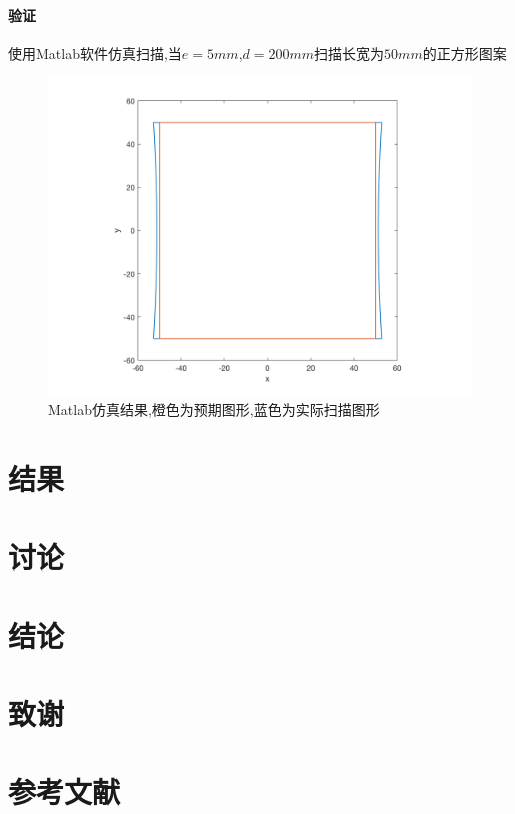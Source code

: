 \documentclass[a4paper,12pt,onecolumn,twoside]{article}
\begin{document}
\paragraph{验证}
使用Matlab软件仿真扫描,当$e=5mm$,$d=200mm$扫描长宽为$50mm$的正方形图案\\
\begin{figure}[h]
\centering
\includegraphics[width=\linewidth]{MG7.png}
\caption{Matlab仿真结果,橙色为预期图形,蓝色为实际扫描图形}
\end{figure}

\section{结果}

\newpage
\section{讨论}

\newpage
\section{结论}

\newpage
\section{致谢}

\newpage
\section{参考文献}
\end{document}
